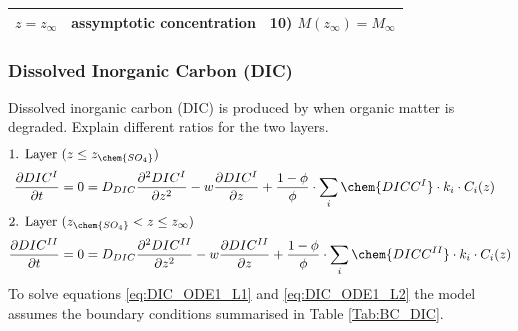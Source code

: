 \documentclass[gmd, manuscript]{copernicus}
\begin{document}
\begin{table}[tbp]
\begin{tabular}{ |l| l| l|}
$z=z_{\infty}$& assymptotic concentration & 10) $M(z_\infty)=M_\infty$\\
\hline    
\end{tabular}
\label{Tab:BC_PO4+M}
\end{table}

\subsubsection{Dissolved Inorganic Carbon (DIC)}
Dissolved inorganic carbon (DIC) is produced by when organic matter is degraded. Explain different ratios for the two layers.
\begin{align}
\intertext{1. Layer ($z \leq z_{\chem{SO_4}}$)}
  \frac{\partial DIC^I}{\partial t} &= 0 = D_{DIC} \frac{\partial^2DIC^I }{\partial z^2} - w\frac{\partial DIC^I }{\partial z} + \frac{1-\phi}{\phi} \cdot \sum_i \chem{DICC^I} \cdot k_i \cdot C_{i}(z)\label{eq:DIC_ODE1_L1}\\ %
 \intertext{2. Layer ($z_{\chem{SO_4}} < z \leq z_\infty$)} 
  \frac{\partial DIC^{II}}{\partial t} &= 0 = D_{DIC} \frac{\partial^2DIC^{II} }{\partial z^2} - w\frac{\partial DIC^{II} }{\partial z} + \frac{1-\phi}{\phi} \cdot \sum_i \chem{DICC^{II}} \cdot k_i \cdot C_{i}(z)\label{eq:DIC_ODE1_L2} %
\end{align}
To solve equations \ref{eq:DIC_ODE1_L1} and \ref{eq:DIC_ODE1_L2} the model assumes the boundary conditions summarised in Table \ref{Tab:BC_DIC}.
\end{document}
